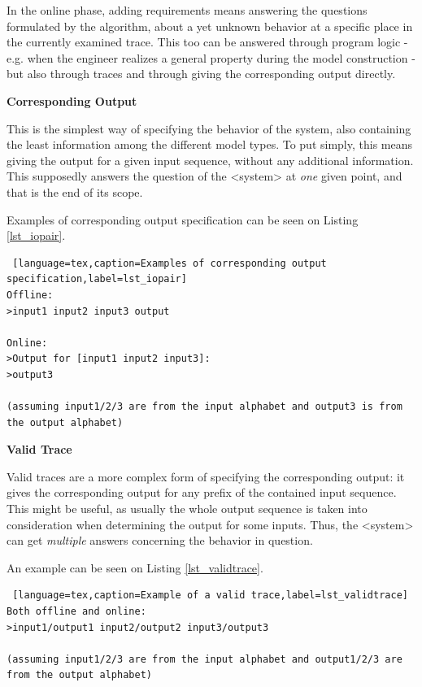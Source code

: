 In the online phase, adding requirements means answering the questions formulated by the algorithm, about a yet unknown behavior at a specific place in the currently examined trace. This too can be answered through program logic - e.g. when the engineer realizes a general property during the model construction - but also through traces and through giving the corresponding output directly.

\textbf{Corresponding Output}

This is the simplest way of specifying the behavior of the system, also containing the least information among the different model types. To put simply, this means giving the output for a given input sequence, without any additional information. This supposedly answers the question of the <system> at \textit{one} given point, and that is the end of its scope.

Examples of corresponding output specification can be seen on Listing \ref{lst_iopair}.

\bigskip
\begin{lstlisting} [language=tex,caption=Examples of corresponding output specification,label=lst_iopair]
Offline: 
>input1 input2 input3 output

Online: 
>Output for [input1 input2 input3]:
>output3

(assuming input1/2/3 are from the input alphabet and output3 is from the output alphabet)
\end{lstlisting}

\textbf{Valid Trace}

Valid traces are a more complex form of specifying the corresponding output: it gives the corresponding output for any prefix of the contained input sequence. This might be useful, as usually the whole output sequence is taken into consideration when determining the output for some inputs. Thus, the <system> can get \textit{multiple} answers concerning the behavior in question.

An example can be seen on Listing \ref{lst_validtrace}.

\bigskip
\begin{lstlisting} [language=tex,caption=Example of a valid trace,label=lst_validtrace]
Both offline and online:
>input1/output1 input2/output2 input3/output3

(assuming input1/2/3 are from the input alphabet and output1/2/3 are from the output alphabet) 
\end{lstlisting}

